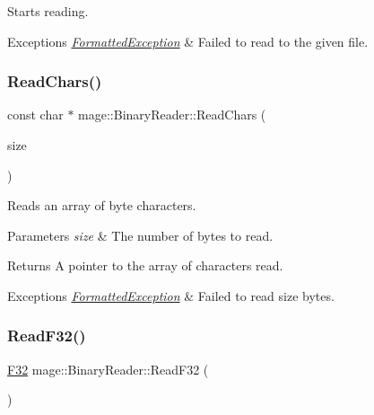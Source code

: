 Starts reading.


\begin{DoxyExceptions}{Exceptions}
{\em \hyperlink{structmage_1_1_formatted_exception}{Formatted\+Exception}} & Failed to read to the given file. \\
\hline
\end{DoxyExceptions}
\hypertarget{classmage_1_1_binary_reader_af1e0e4ab815e23c72ab65fd7c0748d3f}{}\label{classmage_1_1_binary_reader_af1e0e4ab815e23c72ab65fd7c0748d3f} 
\subsubsection{\texorpdfstring{Read\+Chars()}{ReadChars()}}
{\footnotesize\ttfamily const char $\ast$ mage\+::\+Binary\+Reader\+::\+Read\+Chars (\begin{DoxyParamCaption}\item[{size\+\_\+t}]{size }\end{DoxyParamCaption})\hspace{0.3cm}{\ttfamily [protected]}}

Reads an array of byte characters.


\begin{DoxyParams}{Parameters}
{\em size} & The number of bytes to read. \\
\hline
\end{DoxyParams}
\begin{DoxyReturn}{Returns}
A pointer to the array of characters read. 
\end{DoxyReturn}

\begin{DoxyExceptions}{Exceptions}
{\em \hyperlink{structmage_1_1_formatted_exception}{Formatted\+Exception}} & Failed to read {\ttfamily size} bytes. \\
\hline
\end{DoxyExceptions}
\hypertarget{classmage_1_1_binary_reader_abb3c1af4b0e355ea3ff07de5130cc56c}{}\label{classmage_1_1_binary_reader_abb3c1af4b0e355ea3ff07de5130cc56c} 
\subsubsection{\texorpdfstring{Read\+F32()}{ReadF32()}}
{\footnotesize\ttfamily \hyperlink{namespacemage_aa97e833b45f06d60a0a9c4fc22ae02c0}{F32} mage\+::\+Binary\+Reader\+::\+Read\+F32 (\begin{DoxyParamCaption}{ }\end{DoxyParamCaption})\hspace{0.3cm}{\ttfamily [protected]}}

